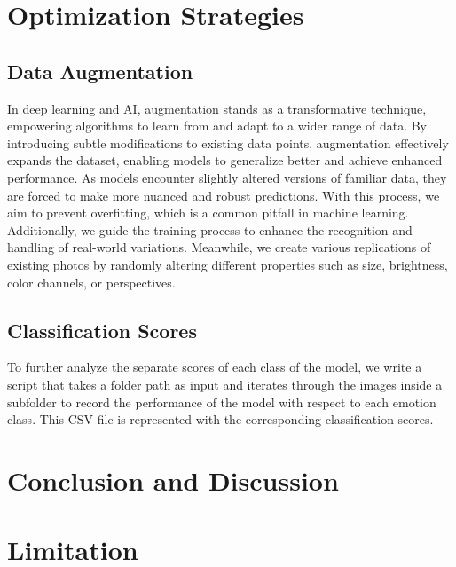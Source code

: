 \section{Optimization Strategies}
\label{sec:optim}


\subsection{Data Augmentation}
\label{sec:optim:aug}

In deep learning and AI, 
augmentation stands as a transformative technique, 
empowering algorithms to learn from and adapt to a wider range of data. 
By introducing subtle modifications to existing data points, 
augmentation effectively expands the dataset, 
enabling models to generalize better and achieve enhanced performance. 
As models encounter slightly altered versions of familiar data, 
they are forced to make more nuanced and robust predictions. 
With this process, we aim to prevent overfitting, which is a common pitfall in machine learning. 
Additionally, we guide the training process to enhance the recognition and handling of real-world variations.
Meanwhile, we create various replications of existing photos by randomly altering different properties such as size, brightness, color channels, or perspectives.


\subsection{Classification Scores}
\label{sec:optim:csv}
To further analyze the separate scores of each class of the model, 
we write a script that takes a folder path as input and iterates through the images inside a subfolder to record the performance of the model with respect to each emotion class. 
This CSV file is represented with the corresponding classification scores. 

\section{Conclusion and Discussion}
\label{sec:conclusion}

\section{Limitation}
\label{sec:limitation}

